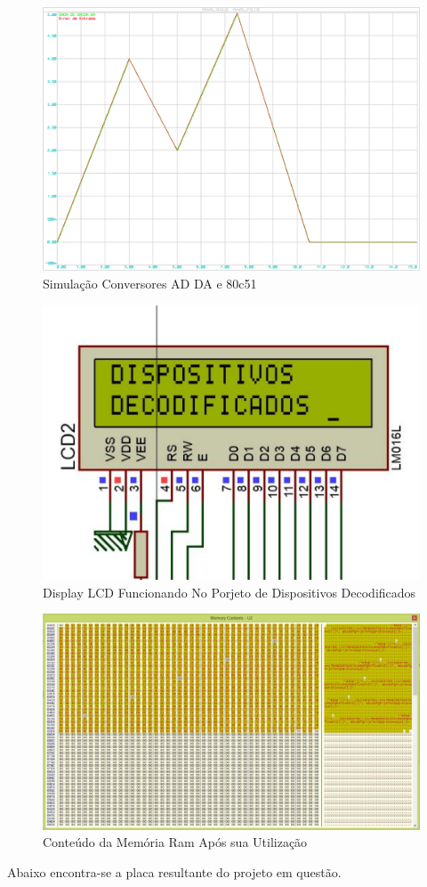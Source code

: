 \documentclass{Fabiano_file}
\begin{document}
\begin{figure}[h!]
\centering
\includegraphics[width=.6\textwidth]{ad_da.pdf}
\caption{Simulação Conversores AD DA e 80c51}
\label{fig:adc_8051_dac_ideal}
\end{figure}

\begin{figure}[h!]
\centering
\includegraphics[width=.5\textwidth]{LCD.pdf}
\caption{Display LCD Funcionando No Porjeto de Dispositivos Decodificados}
\label{fig:adc_8051_dac_ideal}
\end{figure}

\begin{figure}[h!]
\centering
\includegraphics[width=.75\textwidth]{memory_contents.pdf}
\caption{Conteúdo da Memória Ram Após sua Utilização}
\label{fig:adc_8051_dac_ideal}
\end{figure}

\newpage

Abaixo encontra-se a placa resultante do projeto em questão.
\end{document}
